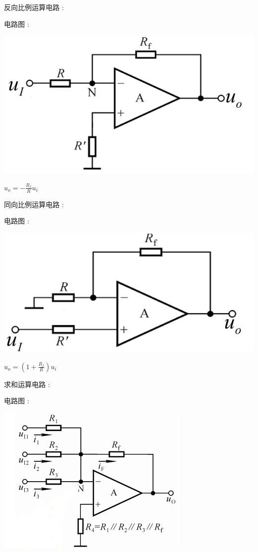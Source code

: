 \documentclass[UTF8, 12pt]{ctexart}
\begin{document}
	反向比例运算电路 :

	电路图 :

	\includegraphics[scale = 0.4]{07/反向比例运算电路电路图.png}

	$ u_{o} = -\frac{R_{f}}{R}u_{i} $

	同向比例运算电路 :

	电路图 :

	\includegraphics[scale = 0.4]{07/同向比例运算电路电路图.png}

	$ u_{o} = (1+\frac{R_{f}}{R})u_{i} $

	求和运算电路 :

	电路图 :

	\includegraphics[scale = 0.4]{07/求和运算电路电路图.png}
\end{document}
